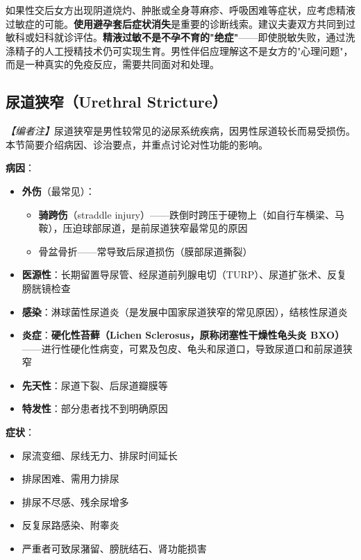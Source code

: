 \begin{tcolorbox}[colback=pink!5!white,colframe=red!50!black,title=贴心小叮咛]
如果性交后女方出现阴道烧灼、肿胀或全身荨麻疹、呼吸困难等症状，应考虑精液过敏症的可能。\textbf{使用避孕套后症状消失}是重要的诊断线索。建议夫妻双方共同到过敏科或妇科就诊评估。\textbf{精液过敏不是不孕不育的"绝症"}——即使脱敏失败，通过洗涤精子的人工授精技术仍可实现生育。男性伴侣应理解这不是女方的"心理问题"，而是一种真实的免疫反应，需要共同面对和处理。
\end{tcolorbox}

\subsection{尿道狭窄（Urethral Stricture）}
\label{subsec:urethral_stricture}

\noindent\textit{【编者注】}尿道狭窄是男性较常见的泌尿系统疾病，因男性尿道较长而易受损伤。本节简要介绍病因、诊治要点，并重点讨论对性功能的影响。

\vspace{0.5em}
\noindent\textbf{病因}：

\begin{itemize}[leftmargin=2cm]
	\item \textbf{外伤}（最常见）：
	\begin{itemize}
		\item \textbf{骑跨伤}（straddle injury）——跌倒时跨压于硬物上（如自行车横梁、马鞍），压迫球部尿道，是前尿道狭窄最常见的原因
		\item 骨盆骨折——常导致后尿道损伤（膜部尿道撕裂）
	\end{itemize}
	\item \textbf{医源性}：长期留置导尿管、经尿道前列腺电切（TURP）、尿道扩张术、反复膀胱镜检查
	\item \textbf{感染}：淋球菌性尿道炎（是发展中国家尿道狭窄的常见原因），结核性尿道炎
	\item \textbf{炎症}：\textbf{硬化性苔藓（Lichen Sclerosus，原称闭塞性干燥性龟头炎 BXO）}——进行性硬化性病变，可累及包皮、龟头和尿道口，导致尿道口和前尿道狭窄
	\item \textbf{先天性}：尿道下裂、后尿道瓣膜等
	\item \textbf{特发性}：部分患者找不到明确原因
\end{itemize}

\vspace{0.5em}
\noindent\textbf{症状}：
\begin{itemize}[leftmargin=2cm]
	\item 尿流变细、尿线无力、排尿时间延长
	\item 排尿困难、需用力排尿
	\item 排尿不尽感、残余尿增多
	\item 反复尿路感染、附睾炎
	\item 严重者可致尿潴留、膀胱结石、肾功能损害
\end{itemize}

